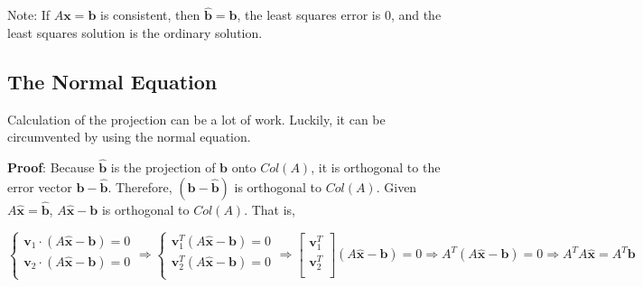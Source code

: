 Note: If $A \mathbf{x} = \mathbf{b}$ is consistent, then $\hat{\mathbf{b}} = \mathbf{b}$, the least squares error is $0$, and the least squares solution is the ordinary solution.

\subsection{The Normal Equation}

Calculation of the projection can be a lot of work.
Luckily, it can be circumvented by using the normal equation.


\textbf{Proof}: Because $\hat{\mathbf{b}}$ is the projection of $\mathbf{b}$ onto $Col(A)$, it is orthogonal to the error vector $\mathbf{b} - \hat{\mathbf{b}}$.
Therefore, $(\mathbf{b} - \hat{\mathbf{b}})$ is orthogonal to $Col(A)$.
Given $A \hat{\mathbf{x}} = \hat{\mathbf{b}}$, $A \hat{\mathbf{x}} - \mathbf{b}$ is orthogonal to $Col(A)$. That is,

$$
\begin{cases}
    \mathbf{v}_1 \cdot (A \hat{\mathbf{x}} - \mathbf{b}) = 0 \\
    \mathbf{v}_2 \cdot (A \hat{\mathbf{x}} - \mathbf{b}) = 0 \\
\end{cases}
\Rightarrow
\begin{cases}
    \mathbf{v}_1^T (A \hat{\mathbf{x}} - \mathbf{b}) = 0 \\
    \mathbf{v}_2^T (A \hat{\mathbf{x}} - \mathbf{b}) = 0 \\
\end{cases}
\Rightarrow
\begin{bmatrix}
    \mathbf{v}_1^T \\
    \mathbf{v}_2^T \\
\end{bmatrix}
(A \hat{\mathbf{x}} - \mathbf{b}) = 0
\Rightarrow
A^T (A \hat{\mathbf{x}} - \mathbf{b}) = 0
\Rightarrow
A^T A \hat{\mathbf{x}} = A^T \mathbf{b}
$$

